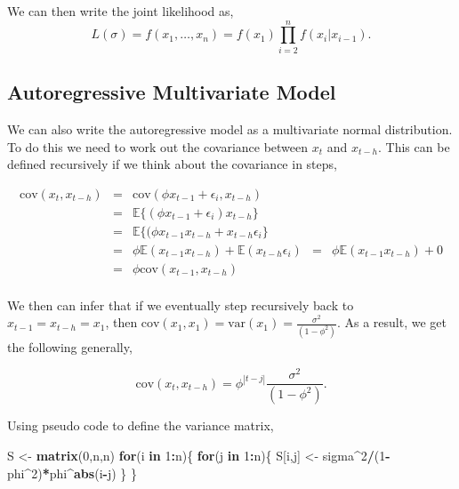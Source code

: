 \documentclass[
]{article}
\newenvironment{Shaded}{\begin{snugshade}}{\end{snugshade}}
\newcommand{\ControlFlowTok}[1]{\textcolor[rgb]{0.13,0.29,0.53}{\textbf{#1}}}
\newcommand{\DecValTok}[1]{\textcolor[rgb]{0.00,0.00,0.81}{#1}}
\newcommand{\FunctionTok}[1]{\textcolor[rgb]{0.13,0.29,0.53}{\textbf{#1}}}
\newcommand{\NormalTok}[1]{#1}
\newcommand{\OtherTok}[1]{\textcolor[rgb]{0.56,0.35,0.01}{#1}}
\newcommand{\SpecialCharTok}[1]{\textcolor[rgb]{0.81,0.36,0.00}{\textbf{#1}}}
\begin{document}
We can then write the joint likelihood as, \[
  L(\sigma) = f(x_1, \ldots, x_n) = f(x_1) \prod_{i=2}^n f(x_i | x_{i-1}).
\]

\hypertarget{autoregressive-multivariate-model}{%
\subsection{Autoregressive Multivariate
Model}\label{autoregressive-multivariate-model}}

We can also write the autoregressive model as a multivariate normal
distribution. To do this we need to work out the covariance between
\(x_t\) and \(x_{t-h}\). This can be defined recursively if we think
about the covariance in steps,

\begin{eqnarray}
  \text{cov}(x_t, x_{t-h}) & = & \text{cov}(\phi x_{t-1} + \epsilon_i, x_{t-h})\\
                           & = & \mathbb{E}\{ ( \phi x_{t-1} + \epsilon_i ) x_{t-h}\} \\
                           & = & \mathbb{E}\{ ( \phi x_{t-1} x_{t-h} + x_{t-h}\epsilon_i \} \\
                           & = & \phi \mathbb{E} ( x_{t-1} x_{t-h} ) + \mathbb{E}(x_{t-h}\epsilon_i) 
                           & = & \phi \mathbb{E} ( x_{t-1} x_{t-h} ) + 0 \\
                           & = & \phi \text{cov}(x_{t-1},x_{t-h})\\
\end{eqnarray}

We then can infer that if we eventually step recursively back to
\(x_{t-1} = x_{t-h} = x_1\), then
\(\text{cov}(x_{1},x_{1}) = \text{var}(x_{1}) = \frac{\sigma^2}{ (1-\phi^2) }\).
As a result, we get the following generally,

\[
  \text{cov}(x_t, x_{t-h}) = \phi^{|t-j|} \frac{\sigma^2}{ (1-\phi^2) }.
\]

Using pseudo code to define the variance matrix,

\begin{Shaded}
\begin{Highlighting}[]
\NormalTok{S }\OtherTok{\textless{}{-}} \FunctionTok{matrix}\NormalTok{(}\DecValTok{0}\NormalTok{,n,n)}
\ControlFlowTok{for}\NormalTok{(i }\ControlFlowTok{in} \DecValTok{1}\SpecialCharTok{:}\NormalTok{n)\{}
  \ControlFlowTok{for}\NormalTok{(j }\ControlFlowTok{in} \DecValTok{1}\SpecialCharTok{:}\NormalTok{n)\{}
\NormalTok{    S[i,j] }\OtherTok{\textless{}{-}}\NormalTok{ sigma}\SpecialCharTok{\^{}}\DecValTok{2}\SpecialCharTok{/}\NormalTok{(}\DecValTok{1}\SpecialCharTok{{-}}\NormalTok{phi}\SpecialCharTok{\^{}}\DecValTok{2}\NormalTok{)}\SpecialCharTok{*}\NormalTok{phi}\SpecialCharTok{\^{}}\FunctionTok{abs}\NormalTok{(i}\SpecialCharTok{{-}}\NormalTok{j)}
\NormalTok{  \}}
\NormalTok{\}}
\end{Highlighting}
\end{Shaded}
\end{document}
